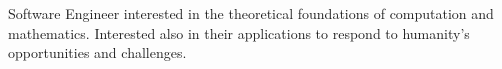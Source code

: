 \begin{cvparagraph}

Software Engineer interested in the theoretical foundations of computation and mathematics.\newline
Interested also in their applications to respond to humanity's opportunities and challenges.
\end{cvparagraph}
